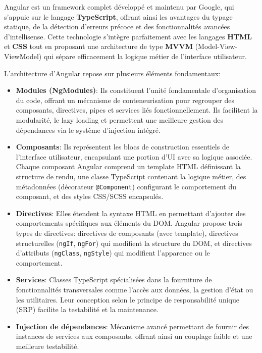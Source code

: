  Angular est un framework complet développé et maintenu par Google, qui s'appuie sur le langage \textbf{TypeScript}, offrant ainsi les avantages du typage statique, de la détection d'erreurs précoce et des fonctionnalités avancées d'intellisense. Cette technologie s'intègre parfaitement avec les langages \textbf{HTML} et \textbf{CSS} tout en proposant une architecture de type \textbf{MVVM} (Model-View-ViewModel) qui sépare efficacement la logique métier de l'interface utilisateur.
 
 \vspace{0.5cm}
 
 L'architecture d'Angular repose sur plusieurs éléments fondamentaux:
 
 \begin{itemize}
    \item \textbf{Modules (NgModules)}: Ils constituent l'unité fondamentale d'organisation du code, offrant un mécanisme de conteneurisation pour regrouper des composants, directives, pipes et services liés fonctionnellement. Ils facilitent la modularité, le lazy loading et permettent une meilleure gestion des dépendances via le système d'injection intégré.
     
    \item \textbf{Composants}: Ils représentent les blocs de construction essentiels de l'interface utilisateur, encapsulant une portion d'UI avec sa logique associée. Chaque composant Angular comprend un template HTML définissant la structure de rendu, une classe TypeScript contenant la logique métier, des métadonnées (décorateur \texttt{@Component}) configurant le comportement du composant, et des styles CSS/SCSS encapsulés.
     
    \item \textbf{Directives}: Elles étendent la syntaxe HTML en permettant d'ajouter des comportements spécifiques aux éléments du DOM. Angular propose trois types de directives: directives de composants (avec template), directives structurelles (\texttt{ngIf}, \texttt{ngFor}) qui modifient la structure du DOM, et directives d'attributs (\texttt{ngClass}, \texttt{ngStyle}) qui modifient l'apparence ou le comportement.
     
    \item \textbf{Services}: Classes TypeScript spécialisées dans la fourniture de fonctionnalités transversales comme l'accès aux données, la gestion d'état ou les utilitaires. Leur conception selon le principe de responsabilité unique (SRP) facilite la testabilité et la maintenance.
    
    \item \textbf{Injection de dépendances}: Mécanisme avancé permettant de fournir des instances de services aux composants, offrant ainsi un couplage faible et une meilleure testabilité.
 \end{itemize}
 
